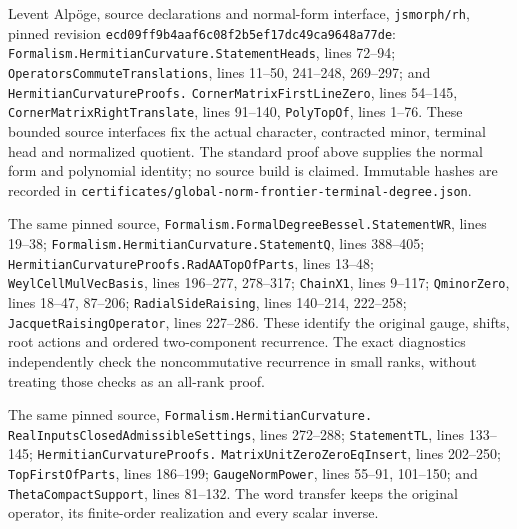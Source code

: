 Levent Alp\"oge, source declarations and normal-form interface,
\texttt{jsmorph/rh}, pinned revision
\texttt{ecd09ff9b4aaf6c08f2b5ef17dc49ca9648a77de}:
\texttt{Formalism.HermitianCurvature.StatementHeads}, lines 72--94;
\texttt{OperatorsCommuteTranslations}, lines 11--50, 241--248,
269--297; and \texttt{HermitianCurvatureProofs.}
\texttt{CornerMatrixFirstLineZero}, lines 54--145,
\texttt{CornerMatrixRightTranslate}, lines 91--140,
\texttt{PolyTopOf}, lines 1--76.
These bounded source interfaces fix the actual character, contracted
minor, terminal head and normalized quotient.  The standard proof
above supplies the normal form and polynomial identity; no source
build is claimed.  Immutable hashes are recorded in
\texttt{certificates/global-norm-frontier-terminal-degree.json}.

The same pinned source,
\texttt{Formalism.FormalDegreeBessel.StatementWR}, lines 19--38;
\texttt{Formalism.HermitianCurvature.StatementQ}, lines 388--405;
\texttt{HermitianCurvatureProofs.RadAATopOfParts}, lines 13--48;
\texttt{WeylCellMulVecBasis}, lines 196--277, 278--317;
\texttt{ChainX1}, lines 9--117;
\texttt{QminorZero}, lines 18--47, 87--206;
\texttt{RadialSideRaising}, lines 140--214, 222--258;
\texttt{JacquetRaisingOperator}, lines 227--286.
These identify the original gauge, shifts, root actions and ordered
two-component recurrence.  The exact diagnostics independently
check the noncommutative recurrence in small ranks, without treating
those checks as an all-rank proof.

The same pinned source,
\texttt{Formalism.HermitianCurvature.}\allowbreak
\texttt{RealInputsClosedAdmissibleSettings},
lines 272--288;
\texttt{StatementTL}, lines 133--145;
\texttt{HermitianCurvatureProofs.}\allowbreak
\texttt{MatrixUnitZeroZeroEqInsert},
lines 202--250;
\texttt{TopFirstOfParts}, lines 186--199;
\texttt{GaugeNormPower}, lines 55--91, 101--150;
and \texttt{ThetaCompactSupport}, lines 81--132.
The word transfer keeps the original
operator, its finite-order realization and every scalar inverse.
